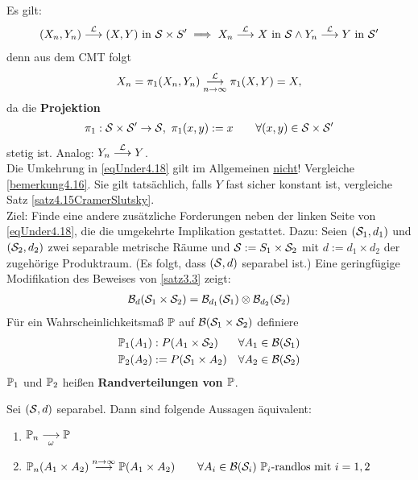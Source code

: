Es gilt:
\begin{align}\label{eqUnder4.18}
	(X_n,Y_n)\stackrel{\L}{\longrightarrow}(X,Y)\text { in }\S\times S'
	\implies X_n\stackrel{\L}{\longrightarrow} X\text{ in }\S\wedge
	Y_n\stackrel{\L}{\longrightarrow} Y\text{ in }\S'
\end{align}
denn aus dem CMT folgt
\begin{align*}
	X_n=\pi_1(X_n,Y_n)\stackrelnew{n\to\infty}{\L}{\longrightarrow}\pi_1(X,Y)=X,
\end{align*}
da die \textbf{Projektion}
\begin{align*}
	\pi_1:\S\times\S'\to\S,~\pi_1(x,y):=x\qquad\forall (x,y)\in\S\times\S'
\end{align*}
stetig ist. Analog: $Y_n\stackrel{\L}{\longrightarrow} Y$.\\
Die Umkehrung in \eqref{eqUnder4.18} gilt im Allgemeinen \underline{nicht}! 
Vergleiche \ref{bemerkung4.16}. 
Sie gilt tatsächlich, falls $Y$ fast sicher konstant ist, vergleiche Satz \ref{satz4.15CramerSlutsky}.\\
Ziel: Finde eine andere zusätzliche Forderungen neben der linken Seite von \eqref{eqUnder4.18}, die die umgekehrte Implikation gestattet. 
Dazu:\nl
Seien $(\S_1,d_1)$ und $(\S_2,d_2)$ zwei separable metrische Räume und $\S:=S_1\times\S_2$ mit $d:=d_1\times d_2$ der zugehörige Produktraum. 
(Es folgt, dass $(\S,d)$ separabel ist.) 
Eine geringfügige Modifikation des Beweises von \ref{satz3.3} zeigt:
\begin{align*}
	\B_d(\S_1\times\S_2)=\B_{d_1}(\S_1)\otimes\B_{d_2}(\S_2)
\end{align*}
Für ein Wahrscheinlichkeitsmaß $\P$ auf $\B(\S_1\times\S_2)$ definiere 
\begin{align*}
	\P_1(A_1)&:P(A_1\times\S_2) &\forall A_1\in\B(\S_1)\\
	\P_2(A_2)&:=P(\S_1\times A_2) &\forall A_2\in\B(\S_2)
\end{align*}
$\P_1$ und $\P_2$ heißen \textbf{Randverteilungen von $\P$}.

\begin{theorem}\label{theorem4.19}
	Sei $(\S,d)$ separabel. 
	Dann sind folgende Aussagen äquivalent:
	\begin{enumerate}[label=(\arabic*)]
		\item $\begin{aligned}
			\P_n\stackrelnew{\omega}{}{\longrightarrow} \P 
		\end{aligned}$
		\item $\begin{aligned}
			\P_n(A_1\times A_2)\stackrel{n\to\infty}{\longrightarrow} \P(A_1\times A_2)\qquad\forall A_i\in\B(\S_i)~\P_i\text{-randlos mit } i=1,2
		\end{aligned}$
	\end{enumerate}
\end{theorem}

